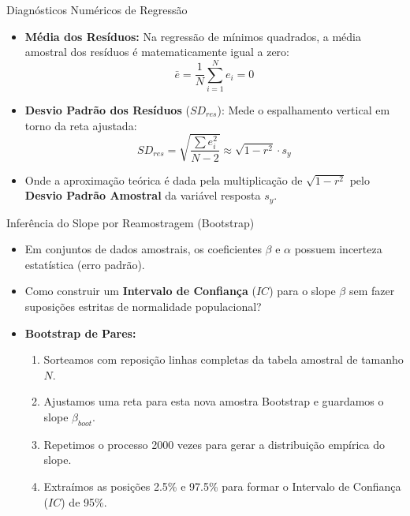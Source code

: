 \begin{frame}{Diagnósticos Numéricos de Regressão}
    \begin{itemize}
        \item \textbf{Média dos Resíduos:} Na regressão de mínimos quadrados, a média amostral dos resíduos é matematicamente igual a zero:
        $$\bar{e} = \frac{1}{N} \sum_{i=1}^N e_i = 0$$
        \item \textbf{Desvio Padrão dos Resíduos} ($SD_{res}$): Mede o espalhamento vertical em torno da reta ajustada:
        $$SD_{res} = \sqrt{\frac{\sum e_i^2}{N - 2}} \approx \sqrt{1 - r^2} \cdot s_y$$
        \item Onde a aproximação teórica é dada pela multiplicação de $\sqrt{1 - r^2}$ pelo \textbf{Desvio Padrão Amostral} da variável resposta $s_y$.
    \end{itemize}
\end{frame}

\begin{frame}{Inferência do Slope por Reamostragem (Bootstrap)}
    \begin{itemize}
        \item Em conjuntos de dados amostrais, os coeficientes $\beta$ e $\alpha$ possuem incerteza estatística (erro padrão).
        \item Como construir um \textbf{Intervalo de Confiança} ($IC$) para o slope $\beta$ sem fazer suposições estritas de normalidade populacional?
        \item \textbf{Bootstrap de Pares:}
        \begin{enumerate}
            \item Sorteamos com reposição linhas completas da tabela amostral de tamanho $N$.
            \item Ajustamos uma reta para esta nova amostra Bootstrap e guardamos o slope $\beta_{boot}$.
            \item Repetimos o processo 2000 vezes para gerar a distribuição empírica do slope.
            \item Extraímos as posições 2.5\% e 97.5\% para formar o Intervalo de Confiança ($IC$) de 95\%.
        \end{enumerate}
    \end{itemize}
\end{frame}

